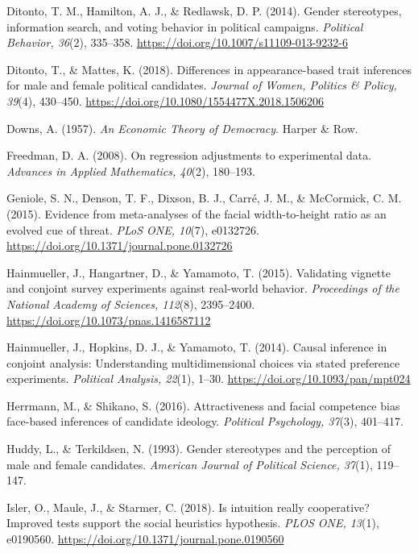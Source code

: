 \documentclass[11pt]{article}\usepackage[]{graphicx}\usepackage[]{xcolor}
\begin{document}
{\begin{list}{}{%
  \setlength{\leftmargin}{1.5em}%
  \setlength{\itemindent}{-1.5em}%
  \setlength{\itemsep}{0pt}%
  \setlength{\parsep}{0pt}%
  \setlength{\topsep}{1pt}%
}
\item Ditonto, T. M., Hamilton, A. J., \& Redlawsk, D. P. (2014). Gender stereotypes, information search, and voting behavior in political campaigns. \emph{Political Behavior, 36}(2), 335--358. \url{https://doi.org/10.1007/s11109-013-9232-6}

\item Ditonto, T., \& Mattes, K. (2018). Differences in appearance-based trait inferences for male and female political candidates. \emph{Journal of Women, Politics \& Policy, 39}(4), 430--450. \url{https://doi.org/10.1080/1554477X.2018.1506206}

\item Downs, A. (1957). \emph{An Economic Theory of Democracy}. Harper \& Row.

\item Freedman, D. A. (2008). On regression adjustments to experimental data. \emph{Advances in Applied Mathematics, 40}(2), 180--193.

\item Geniole, S. N., Denson, T. F., Dixson, B. J., Carr\'e, J. M., \& McCormick, C. M. (2015). Evidence from meta-analyses of the facial width-to-height ratio as an evolved cue of threat. \emph{PLoS ONE, 10}(7), e0132726. \url{https://doi.org/10.1371/journal.pone.0132726}

\item Hainmueller, J., Hangartner, D., \& Yamamoto, T. (2015). Validating vignette and conjoint survey experiments against real-world behavior. \emph{Proceedings of the National Academy of Sciences, 112}(8), 2395--2400. \url{https://doi.org/10.1073/pnas.1416587112}

\item Hainmueller, J., Hopkins, D. J., \& Yamamoto, T. (2014). Causal inference in conjoint analysis: Understanding multidimensional choices via stated preference experiments. \emph{Political Analysis, 22}(1), 1--30. \url{https://doi.org/10.1093/pan/mpt024}

\item Herrmann, M., \& Shikano, S. (2016). Attractiveness and facial competence bias face-based inferences of candidate ideology. \emph{Political Psychology, 37}(3), 401--417.

\item Huddy, L., \& Terkildsen, N. (1993). Gender stereotypes and the perception of male and female candidates. \emph{American Journal of Political Science, 37}(1), 119--147.

\item Isler, O., Maule, J., \& Starmer, C. (2018). Is intuition really cooperative? Improved tests support the social heuristics hypothesis. \emph{PLOS ONE, 13}(1), e0190560. \url{https://doi.org/10.1371/journal.pone.0190560}


\end{list}}
\end{document}
